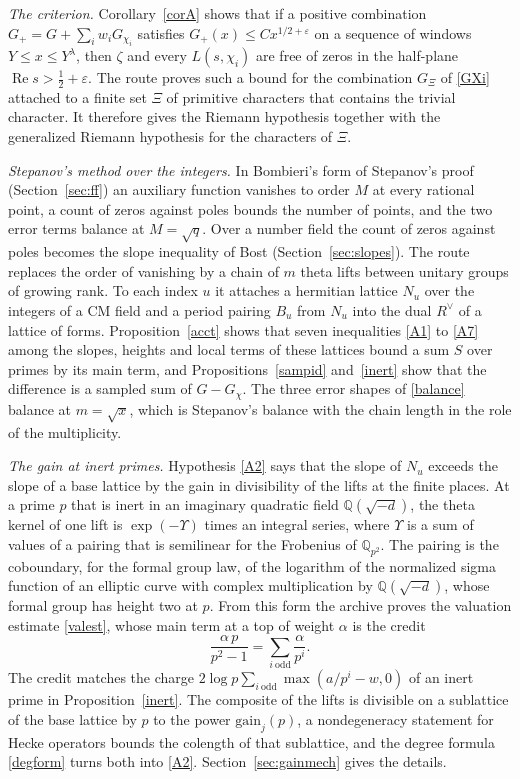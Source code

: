 \documentclass[11pt,letterpaper]{article}
\numberwithin{equation}{section}
\begin{document}
\emph{The criterion.} Corollary~\ref{corA} shows that if a positive combination $G_+=G+\sum_iw_iG_{\chi_i}$ satisfies $G_+(x)\le Cx^{1/2+\varepsilon}$ on a sequence of windows $Y\le x\le Y^\lambda$, then $\zeta$ and every $L(s,\chi_i)$ are free of zeros in the half-plane $\operatorname{Re}s>\tfrac12+\varepsilon$. The route proves such a bound for the combination $G_\Xi$ of \eqref{GXi} attached to a finite set $\Xi$ of primitive characters that contains the trivial character. It therefore gives the Riemann hypothesis together with the generalized Riemann hypothesis for the characters of $\Xi$.

\emph{Stepanov's method over the integers.} In Bombieri's form of Stepanov's proof (Section~\ref{sec:ff}) an auxiliary function vanishes to order $M$ at every rational point, a count of zeros against poles bounds the number of points, and the two error terms balance at $M=\sqrt q$. Over a number field the count of zeros against poles becomes the slope inequality of Bost (Section~\ref{sec:slopes}). The route replaces the order of vanishing by a chain of $m$ theta lifts between unitary groups of growing rank. To each index $u$ it attaches a hermitian lattice $N_u$ over the integers of a CM field and a period pairing $B_u$ from $N_u$ into the dual $R^\vee$ of a lattice of forms. Proposition~\ref{acct} shows that seven inequalities \eqref{A1} to \eqref{A7} among the slopes, heights and local terms of these lattices bound a sum $S$ over primes by its main term, and Propositions~\ref{sampid} and~\ref{inert} show that the difference is a sampled sum of $G-G_\chi$. The three error shapes of \eqref{balance} balance at $m=\sqrt x$, which is Stepanov's balance with the chain length in the role of the multiplicity.

\emph{The gain at inert primes.} Hypothesis \eqref{A2} says that the slope of $N_u$ exceeds the slope of a base lattice by the gain in divisibility of the lifts at the finite places. At a prime $p$ that is inert in an imaginary quadratic field $\mathbb Q(\sqrt{-d})$, the theta kernel of one lift is $\exp(-\Upsilon)$ times an integral series, where $\Upsilon$ is a sum of values of a pairing that is semilinear for the Frobenius of $\mathbb Q_{p^2}$. The pairing is the coboundary, for the formal group law, of the logarithm of the normalized sigma function of an elliptic curve with complex multiplication by $\mathbb Q(\sqrt{-d})$, whose formal group has height two at $p$. From this form the archive proves the valuation estimate \eqref{valest}, whose main term at a top of weight $\alpha$ is the credit
\[
\frac{\alpha\,p}{p^2-1}=\sum_{i\ \mathrm{odd}}\frac{\alpha}{p^i}.
\]
The credit matches the charge $2\log p\sum_{i\ \mathrm{odd}}\max(a/p^i-w,0)$ of an inert prime in Proposition~\ref{inert}. The composite of the lifts is divisible on a sublattice of the base lattice by $p$ to the power $\mathrm{gain}_j(p)$, a nondegeneracy statement for Hecke operators bounds the colength of that sublattice, and the degree formula \eqref{degform} turns both into \eqref{A2}. Section~\ref{sec:gainmech} gives the details.
\end{document}
